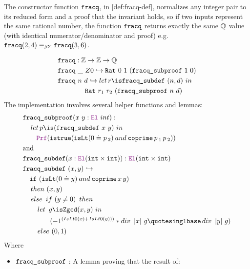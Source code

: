 The constructor function $\texttt{\upshape{fracq}}$, in \cref{def:fracq-def}, normalizes any integer pair to its reduced form and a proof that the invariant holds, so if two inputs represent the same rational number,
the function $\texttt{\upshape{fracq}}$ returns exactly the same $\mathbb{Q}$ value (with identical numerator/denominator and proof) e.g. $\texttt{\upshape{fracq}} (2,4) \equiv_{\beta\Sigma} \texttt{\upshape{fracq}} (3,6)$.

\begin{definition}\label{def:fracq-def}
\begin{align*}
& \kw{fracq} : \Z \ra \Z \ra \Q \\
& \kw{fracq}~\_~Z0 \re \kw{Rat}~0~1~(\kw{fracq\_subproof}~1~0) \\
& \kw{fracq}~n~d \re \mathop{let} r \is \kw{fracq\_subdef}~(n, d)~\mathbin{in}\\
& \qquad \qquad \kw{Rat}~r_1~r_2~(\kw{fracq\_subproof}~n~d) \\
\end{align*}
The implementation involves several helper functions and lemmas:
\begin{align*}
&\kw{fracq\_subproof} (x~y : \el~int): \\
& \quad \mathop{let} p \is (\kw{fracq\_subdef}~x~y)~ \mathbin{in}\\
& \qquad \prf (\kw{istrue} (\kw{isLt} (0 \doteq p\,{}_2) \mathbin{and} \kw{coprime}\,p\,{}_1\,p\,{}_2)) \\
&\text{and}\\
& \kw{fracq\_subdef} (x : \el (\kw{int} \times \kw{int})): \el (\kw{int} \times \kw{int}) \\
& \kw{fracq\_subdef}~(x, y) \re\\
& \quad \kw{if}~(\kw{isLt} (0 \doteq y) \mathbin{and} \kw{coprime}\,x\,y)\\
& \quad \mathop{then}~(x,y) \\
& \quad \mathop{else}~\mathop{if}~(y \neq 0)~\mathop{then} \\
& \qquad \mathop{let}~g \is \kw{Zgcd}(x,y)~ \mathbin{in}  \\
& \qquad\qquad (-1^{(IsLt0(x) + IsLt0(y)))} * \mathop{div}~|x|~g‚ \mathop{div}~|y|~g) \\
& \qquad \mathop{else}~(0,1) \\
\end{align*}
Where
\begin{itemize}
\item $\texttt{\upshape{fracq\_subproof}}$ :  A lemma proving that the result of:\\

\end{itemize}
\end{definition}
